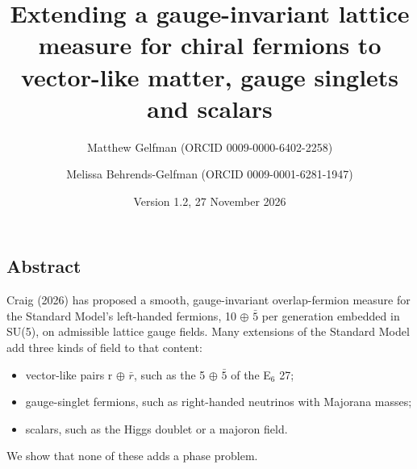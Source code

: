 \documentclass[
]{article}
\title{Extending a gauge-invariant lattice measure for chiral fermions
to vector-like matter, gauge singlets and scalars}
\author{Matthew Gelfman (ORCID 0009-0000-6402-2258) \and Melissa
Behrends-Gelfman (ORCID 0009-0001-6281-1947)}
\date{Version 1.2, 27 November 2026}
\providecommand{\tightlist}{%
  \setlength{\itemsep}{0pt}\setlength{\parskip}{0pt}}
\begin{document}
\maketitle

\hypertarget{abstract}{%
\subsection{Abstract}\label{abstract}}

Craig (2026) has proposed a smooth, gauge-invariant overlap-fermion
measure for the Standard Model's left-handed fermions, 10 \ensuremath{\oplus} \ensuremath{\bar{5}} per
generation embedded in SU(5), on admissible lattice gauge fields. Many
extensions of the Standard Model add three kinds of field to that
content:

\begin{itemize}
\tightlist
\item
  vector-like pairs r \ensuremath{\oplus} \ensuremath{\bar{r}}, such as the 5 \ensuremath{\oplus} \ensuremath{\bar{5}} of the E\ensuremath{_{6}} 27;
\item
  gauge-singlet fermions, such as right-handed neutrinos with Majorana
  masses;
\item
  scalars, such as the Higgs doublet or a majoron field.
\end{itemize}

We show that none of these adds a phase problem.
\end{document}
